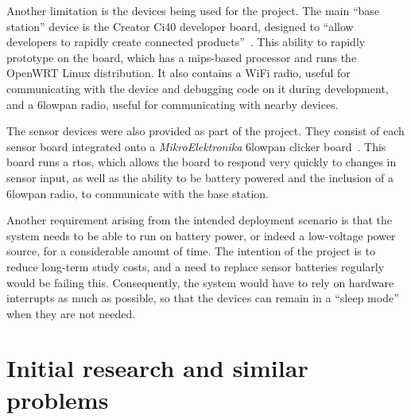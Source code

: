 Another limitation is the devices being used for the project. The main ``base
station'' device is the Creator Ci40 developer board, designed to ``allow
developers to rapidly create connected products''~\cite{creatorci40}. This
ability to rapidly prototype on the board, which has a \acrshort{mips}-based
processor and runs the OpenWRT Linux distribution. It also contains a WiFi
radio, useful for communicating with the device and debugging code on it
during development, and a \gls{6lowpan} radio, useful for communicating with
nearby devices.

The sensor devices were also provided as part of the project. They consist of
each sensor board integrated onto a \textit{MikroElektronika} \gls{6lowpan}
clicker board~\cite{mikroeclick}. This board runs a \acrfull{rtos}, which
allows the board to respond very quickly to changes in sensor input, as well
as the ability to be battery powered and the inclusion of a \gls{6lowpan}
radio, to communicate with the base station.

Another requirement arising from the intended deployment scenario is that the
system needs to be able to run on battery power, or indeed a low-voltage
power source, for a considerable amount of time. The intention of the project
is to reduce long-term study costs, and a need to replace sensor batteries
regularly would be failing this. Consequently, the system would have to rely
on hardware interrupts as much as possible, so that the devices can remain in
a ``sleep mode'' when they are not needed.

\section{Initial research and similar problems}